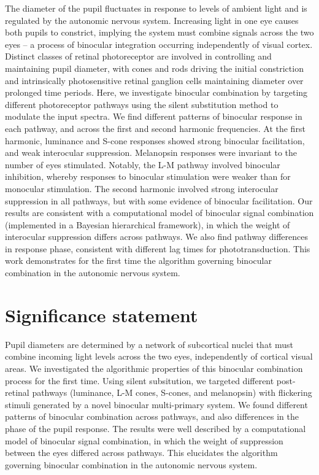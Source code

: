 \documentclass[
]{article}
\begin{document}
The diameter of the pupil fluctuates in response to levels of ambient light and is regulated by the autonomic nervous system. Increasing light in one eye causes both pupils to constrict, implying the system must combine signals across the two eyes -- a process of binocular integration occurring independently of visual cortex. Distinct classes of retinal photoreceptor are involved in controlling and maintaining pupil diameter, with cones and rods driving the initial constriction and intrinsically photosensitive retinal ganglion cells maintaining diameter over prolonged time periods. Here, we investigate binocular combination by targeting different photoreceptor pathways using the silent substitution method to modulate the input spectra. We find different patterns of binocular response in each pathway, and across the first and second harmonic frequencies. At the first harmonic, luminance and S-cone responses showed strong binocular facilitation, and weak interocular suppression. Melanopsin responses were invariant to the number of eyes stimulated. Notably, the L-M pathway involved binocular inhibition, whereby responses to binocular stimulation were weaker than for monocular stimulation. The second harmonic involved strong interocular suppression in all pathways, but with some evidence of binocular facilitation. Our results are consistent with a computational model of binocular signal combination (implemented in a Bayesian hierarchical framework), in which the weight of interocular suppression differs across pathways. We also find pathway differences in response phase, consistent with different lag times for phototransduction. This work demonstrates for the first time the algorithm governing binocular combination in the autonomic nervous system.

\hypertarget{significance-statement}{%
\section{Significance statement}\label{significance-statement}}

Pupil diameters are determined by a network of subcortical nuclei that must combine incoming light levels across the two eyes, independently of cortical visual areas. We investigated the algorithmic properties of this binocular combination process for the first time. Using silent subsitution, we targeted different post-retinal pathways (luminance, L-M cones, S-cones, and melanopsin) with flickering stimuli generated by a novel binocular multi-primary system. We found different patterns of binocular combination across pathways, and also differences in the phase of the pupil response. The results were well described by a computational model of binocular signal combination, in which the weight of suppression between the eyes differed across pathways. This elucidates the algorithm governing binocular combination in the autonomic nervous system.
\end{document}
